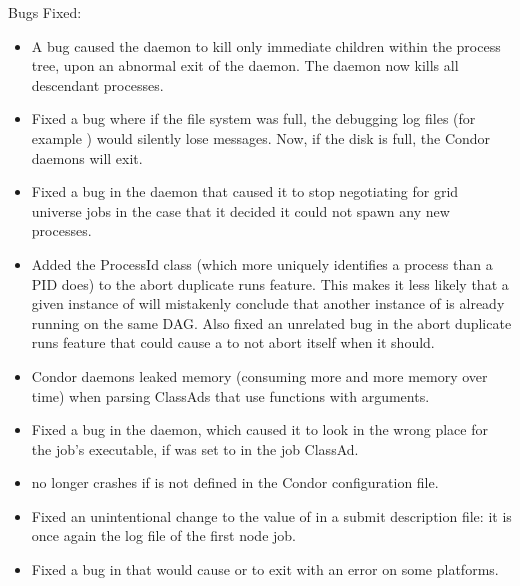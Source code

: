 \noindent Bugs Fixed:

\begin{itemize}

\item A bug caused the  daemon to kill
only immediate children within the process tree,
upon an abnormal exit of the  daemon. 
The  daemon now kills all descendant processes.

\item Fixed a bug where if the file system was full, the debugging log
files (for example ) would silently lose messages.  Now,
if the disk is full, the Condor daemons will 
exit.

\item Fixed a bug in the  daemon that caused it to stop
negotiating for grid universe jobs in the case that it decided
it could not spawn any new  processes.

\item Added the ProcessId class (which more uniquely identifies a
process than a PID does) to the  abort duplicate
runs feature.  This makes it less likely that a given instance of
 will mistakenly conclude that another instance of
 is already running on the same DAG.  Also fixed an
unrelated bug in the abort duplicate runs feature that could cause
a  to not abort itself when it should.

\item Condor daemons leaked memory (consuming more and more memory over time)
when parsing ClassAds that use functions with arguments.

\item Fixed a bug in the  daemon,
which caused it to look in the
wrong place for the job's executable, if  was set
to  in the job ClassAd.

\item {} no longer crashes if  is not defined
in the Condor configuration file.

\item Fixed an unintentional change to the value of 
in a  submit description file: it is once again the log file of
the first node job.

\item Fixed a bug in  that would cause   or
  to exit with an error on some platforms.


\end{itemize}
